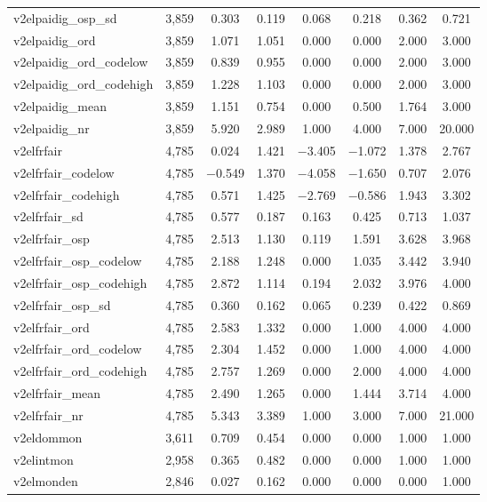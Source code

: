 \begin{table}[!htbp]
\begin{tabular}{@{\extracolsep{5pt}}lccccccc}
v2elpaidig\_osp\_sd & 3,859 & 0.303 & 0.119 & 0.068 & 0.218 & 0.362 & 0.721 \\ 
v2elpaidig\_ord & 3,859 & 1.071 & 1.051 & 0.000 & 0.000 & 2.000 & 3.000 \\ 
v2elpaidig\_ord\_codelow & 3,859 & 0.839 & 0.955 & 0.000 & 0.000 & 2.000 & 3.000 \\ 
v2elpaidig\_ord\_codehigh & 3,859 & 1.228 & 1.103 & 0.000 & 0.000 & 2.000 & 3.000 \\ 
v2elpaidig\_mean & 3,859 & 1.151 & 0.754 & 0.000 & 0.500 & 1.764 & 3.000 \\ 
v2elpaidig\_nr & 3,859 & 5.920 & 2.989 & 1.000 & 4.000 & 7.000 & 20.000 \\ 
v2elfrfair & 4,785 & 0.024 & 1.421 & $-$3.405 & $-$1.072 & 1.378 & 2.767 \\ 
v2elfrfair\_codelow & 4,785 & $-$0.549 & 1.370 & $-$4.058 & $-$1.650 & 0.707 & 2.076 \\ 
v2elfrfair\_codehigh & 4,785 & 0.571 & 1.425 & $-$2.769 & $-$0.586 & 1.943 & 3.302 \\ 
v2elfrfair\_sd & 4,785 & 0.577 & 0.187 & 0.163 & 0.425 & 0.713 & 1.037 \\ 
v2elfrfair\_osp & 4,785 & 2.513 & 1.130 & 0.119 & 1.591 & 3.628 & 3.968 \\ 
v2elfrfair\_osp\_codelow & 4,785 & 2.188 & 1.248 & 0.000 & 1.035 & 3.442 & 3.940 \\ 
v2elfrfair\_osp\_codehigh & 4,785 & 2.872 & 1.114 & 0.194 & 2.032 & 3.976 & 4.000 \\ 
v2elfrfair\_osp\_sd & 4,785 & 0.360 & 0.162 & 0.065 & 0.239 & 0.422 & 0.869 \\ 
v2elfrfair\_ord & 4,785 & 2.583 & 1.332 & 0.000 & 1.000 & 4.000 & 4.000 \\ 
v2elfrfair\_ord\_codelow & 4,785 & 2.304 & 1.452 & 0.000 & 1.000 & 4.000 & 4.000 \\ 
v2elfrfair\_ord\_codehigh & 4,785 & 2.757 & 1.269 & 0.000 & 2.000 & 4.000 & 4.000 \\ 
v2elfrfair\_mean & 4,785 & 2.490 & 1.265 & 0.000 & 1.444 & 3.714 & 4.000 \\ 
v2elfrfair\_nr & 4,785 & 5.343 & 3.389 & 1.000 & 3.000 & 7.000 & 21.000 \\ 
v2eldommon & 3,611 & 0.709 & 0.454 & 0.000 & 0.000 & 1.000 & 1.000 \\ 
v2elintmon & 2,958 & 0.365 & 0.482 & 0.000 & 0.000 & 1.000 & 1.000 \\ 
v2elmonden & 2,846 & 0.027 & 0.162 & 0.000 & 0.000 & 0.000 & 1.000 \\ 

\end{tabular}
\end{table}
